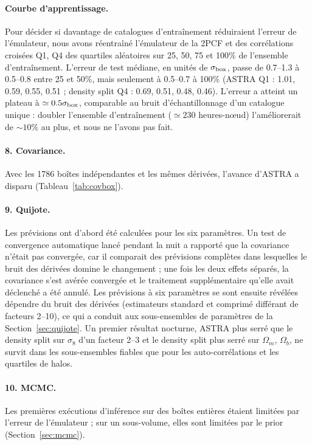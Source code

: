 \paragraph{Courbe d'apprentissage.} Pour décider si davantage de catalogues d'entraînement réduiraient l'erreur de l'émulateur, nous avons réentraîné l'émulateur de la 2PCF et des corrélations croisées Q1, Q4 des quartiles aléatoires sur 25, 50, 75 et 100\% de l'ensemble d'entraînement. L'erreur de test médiane, en unités de $\sigma_{\rm box}$, passe de 0.7--1.3 à 0.5--0.8 entre 25 et 50\%, mais seulement à 0.5--0.7 à 100\% (ASTRA Q1 : 1.01, 0.59, 0.55, 0.51 ; density split Q4 : 0.69, 0.51, 0.48, 0.46). L'erreur a atteint un plateau à $\simeq0.5\sigma_{\rm box}$, comparable au bruit d'échantillonnage d'un catalogue unique : doubler l'ensemble d'entraînement ($\simeq230$ heures-nœud) l'améliorerait de $\sim10\%$ au plus, et nous ne l'avons pas fait.

\paragraph{8. Covariance.} Avec les 1786 boîtes indépendantes et les mêmes dérivées, l'avance d'ASTRA a disparu (Tableau~\ref{tab:covbox}).

\paragraph{9. Quijote.} Les prévisions ont d'abord été calculées pour les six paramètres. Un test de convergence automatique lancé pendant la nuit a rapporté que la covariance n'était pas convergée, car il comparait des prévisions complètes dans lesquelles le bruit des dérivées domine le changement ; une fois les deux effets séparés, la covariance s'est avérée convergée et le traitement supplémentaire qu'elle avait déclenché a été annulé. Les prévisions à six paramètres se sont ensuite révélées dépendre du bruit des dérivées (estimateurs standard et comprimé différant de facteurs 2--10), ce qui a conduit aux sous-ensembles de paramètres de la Section~\ref{sec:quijote}. Un premier résultat nocturne, ASTRA plus serré que le density split sur $\sigma_8$ d'un facteur 2--3 et le density split plus serré sur $\Omega_m$, $\Omega_b$, ne survit dans les sous-ensembles fiables que pour les auto-corrélations et les quartiles de halos.


\paragraph{10. MCMC.} Les premières exécutions d'inférence sur des boîtes entières étaient limitées par l'erreur de l'émulateur ; sur un sous-volume, elles sont limitées par le prior (Section~\ref{sec:mcmc}).

